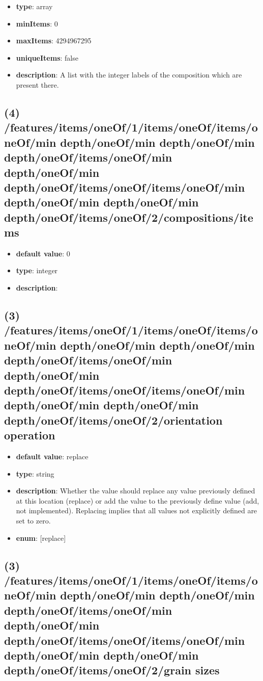 \begin{itemize}[leftmargin=3em]\item {\bf type}: array
\item {\bf minItems}: 0
\item {\bf maxItems}: 4294967295
\item {\bf uniqueItems}: false
\item {\bf description}: A list with the integer labels of the composition which are present there.
\end{itemize}\subsection{(4) /features/items/oneOf/1/items/oneOf/items/oneOf/min depth/oneOf/min depth/oneOf/min depth/oneOf/items/oneOf/min depth/oneOf/min depth/oneOf/items/oneOf/items/oneOf/min depth/oneOf/min depth/oneOf/min depth/oneOf/items/oneOf/2/compositions/items}
\begin{itemize}[leftmargin=4em]\item {\bf default value}: 0
\item {\bf type}: integer
\item {\bf description}: 
\end{itemize}\subsection{(3) /features/items/oneOf/1/items/oneOf/items/oneOf/min depth/oneOf/min depth/oneOf/min depth/oneOf/items/oneOf/min depth/oneOf/min depth/oneOf/items/oneOf/items/oneOf/min depth/oneOf/min depth/oneOf/min depth/oneOf/items/oneOf/2/orientation operation}
\begin{itemize}[leftmargin=3em]\item {\bf default value}: replace
\item {\bf type}: string
\item {\bf description}: Whether the value should replace any value previously defined at this location (replace) or add the value to the previously define value (add, not implemented). Replacing implies that all values not explicitly defined are set to zero.
\item {\bf enum}: [replace]\end{itemize}\subsection{(3) /features/items/oneOf/1/items/oneOf/items/oneOf/min depth/oneOf/min depth/oneOf/min depth/oneOf/items/oneOf/min depth/oneOf/min depth/oneOf/items/oneOf/items/oneOf/min depth/oneOf/min depth/oneOf/min depth/oneOf/items/oneOf/2/grain sizes}
